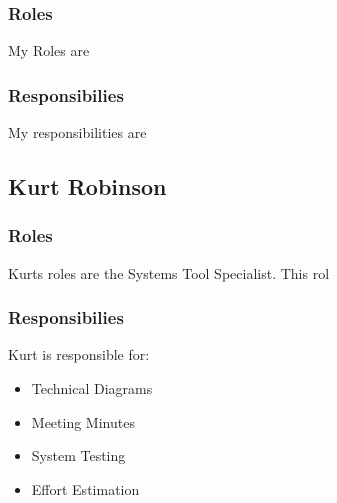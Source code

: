 \subsubsection{Roles}

	My Roles are


\subsubsection{Responsibilies}

	My responsibilities are


\subsection{Kurt Robinson}


\subsubsection{Roles}

	Kurts roles are the Systems Tool Specialist. This rol 


\subsubsection{Responsibilies}

	Kurt is responsible for:

	\begin{itemize}
		\item Technical Diagrams
		\item Meeting Minutes
		\item System Testing
		\item Effort Estimation
	\end{itemize}